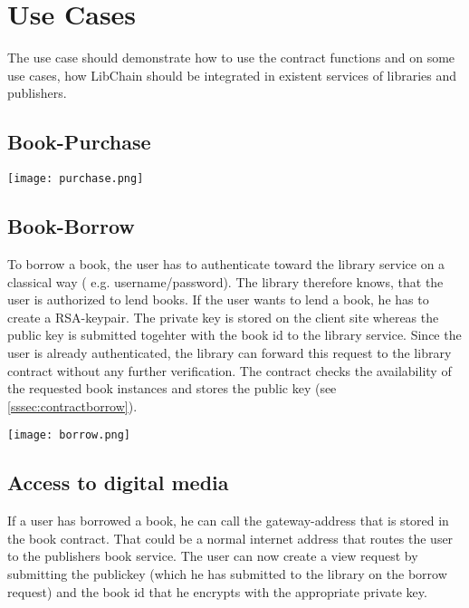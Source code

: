 \section{Use Cases}
The use case should demonstrate how to use the contract functions and on some use cases, how LibChain should be integrated in existent services of libraries and publishers.

\subsection{Book-Purchase}
\vspace{0.3cm}
\texttt{[image: purchase.png]}
\subsection{Book-Borrow}
To borrow a book, the user has to authenticate toward the library service on a classical way ( e.g. username/password). The library therefore knows, that the user is authorized to lend books. If the user wants to lend a book, he has to create a RSA-keypair. The private key is stored on the client site whereas the public key is submitted togehter with the book id to the library service.
Since the user is already authenticated, the library can forward this request to the library contract without any further verification.
The contract checks the availability of the requested book instances and stores the public key (see \ref{sssec:contractborrow}).

\vspace{0.3cm}
\texttt{[image: borrow.png]}


\subsection{Access to digital media \label{sssec:access}}
If a user has borrowed a book, he can call the gateway-address that is stored in the book contract. That could be a normal internet address that routes the user to the publishers book service.
The user can now create a view request by submitting the publickey (which he has submitted to the library on the borrow request) and the book id that he encrypts with the appropriate private key.

